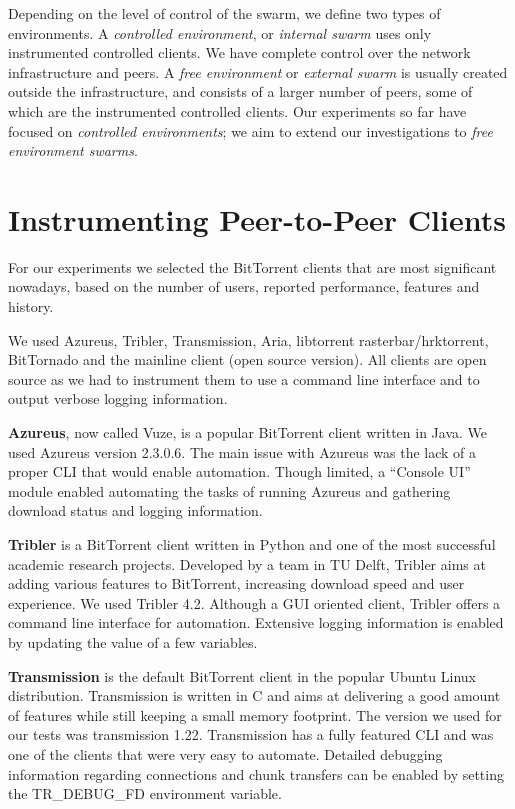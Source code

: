 Depending on the level of control of the swarm, we define two types of
environments. A \textit{controlled environment}, or \textit{internal swarm}
uses only instrumented controlled clients. We have complete control over the
network infrastructure and peers. A \textit{free environment} or
\textit{external swarm} is usually created outside the infrastructure, and
consists of a larger number of peers, some of which are the instrumented
controlled clients. Our experiments so far have focused on \textit{controlled
environments}; we aim to extend our investigations to \textit{free environment
swarms}.

\section{Instrumenting Peer-to-Peer Clients}
\label{sec:deploy-instr}

For our experiments we selected the BitTorrent clients that are most
significant nowadays, based on the number of users, reported performance,
features and history.

We used Azureus, Tribler, Transmission, Aria, libtorrent rasterbar/hrktorrent,
BitTornado and the mainline client (open source version). All clients are open
source as we had to instrument them to use a command line interface and to
output verbose logging information.

\textbf{Azureus}, now called Vuze, is a popular BitTorrent client written in
Java. We used Azureus version 2.3.0.6. The main issue with Azureus was the
lack of a proper CLI that would enable automation. Though limited, a ``Console
UI'' module enabled automating the tasks of running Azureus and gathering
download status and logging information.

\textbf{Tribler} is a BitTorrent client written in Python and one of the most
successful academic research projects. Developed by a team in TU Delft,
Tribler aims at adding various features to BitTorrent, increasing download
speed and user experience. We used Tribler 4.2. Although a GUI oriented
client, Tribler offers a command line interface for automation. Extensive
logging information is enabled by updating the value of a few variables.

\textbf{Transmission} is the default BitTorrent client in the popular Ubuntu
Linux distribution. Transmission is written in C and aims at delivering a good
amount of features while still keeping a small memory footprint. The version
we used for our tests was transmission 1.22. Transmission has a fully
featured CLI and was one of the clients that were very easy to automate.
Detailed debugging information regarding connections and chunk transfers can
be enabled by setting the TR\_DEBUG\_FD environment variable.

